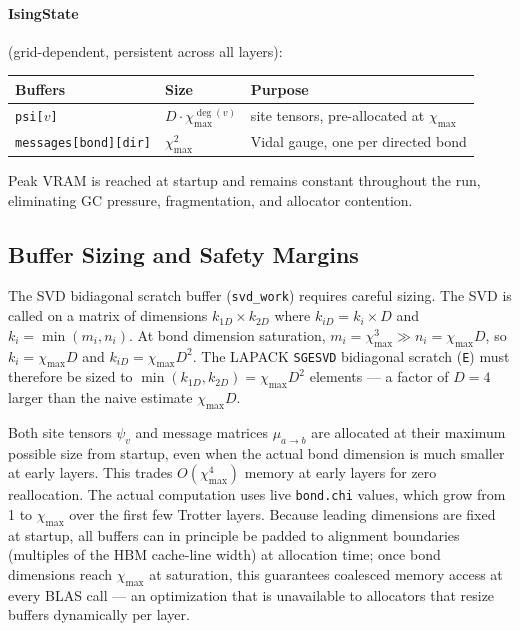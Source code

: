 \documentclass[11pt]{article}
\newcommand{\chimax}{\chi_{\mathrm{max}}}
\begin{document}
\paragraph{IsingState} (grid-dependent, persistent across all layers):
\begin{center}
\begin{tabular}{@{}lll@{}}
\toprule
Buffers & Size & Purpose \\
\midrule
\texttt{psi[}$v$\texttt{]} & $D \cdot \chimax^{\deg(v)}$ & site tensors, pre-allocated at $\chimax$ \\
\texttt{messages[bond][dir]} & $\chimax^2$ & Vidal gauge, one per directed bond \\
\bottomrule
\end{tabular}
\end{center}

Peak VRAM is reached at startup and remains constant throughout the run,
eliminating GC pressure, fragmentation, and allocator contention.

\subsection{Buffer Sizing and Safety Margins}

The SVD bidiagonal scratch buffer (\texttt{svd\_work}) requires careful sizing.
The SVD is called on a matrix of dimensions $k_{1D} \times k_{2D}$ where
$k_{iD} = k_i \times D$ and $k_i = \min(m_i, n_i)$. At bond dimension saturation,
$m_i = \chimax^3 \gg n_i = \chimax D$, so $k_i = \chimax D$ and
$k_{iD} = \chimax D^2$. The LAPACK \texttt{SGESVD} bidiagonal scratch (\texttt{E})
must therefore be sized to $\min(k_{1D}, k_{2D}) = \chimax D^2$ elements — a
factor of $D=4$ larger than the naive estimate $\chimax D$.

Both site tensors $\psi_v$ and message matrices $\mu_{a\to b}$ are allocated at their maximum possible size from
startup, even when the actual bond dimension is much smaller at early layers.
This trades $O(\chimax^4)$ memory at early layers for zero reallocation.
The actual computation uses live \texttt{bond.chi} values, which grow from 1 to
$\chimax$ over the first few Trotter layers.
Because leading dimensions are fixed at startup, all buffers can in principle be
padded to alignment boundaries (multiples of the HBM cache-line width) at
allocation time; once bond dimensions reach $\chimax$ at saturation, this
guarantees coalesced memory access at every \textsc{BLAS} call ---
an optimization that is unavailable to allocators that resize buffers
dynamically per layer.
\end{document}
